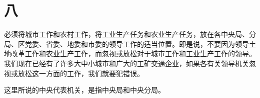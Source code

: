\section*{八}

必须将城市工作和农村工作，将工业生产任务和农业生产任务，放在各中央局、分局、区党委、省委、地委和市委的领导工作的适当位置。即是说，不要因为领导土地改革工作和农业生产工作，而忽视或放松对于城市工作和工业生产工作的领导。我们现在已经有了许多大中小城市和广大的工矿交通企业，如果各有关领导机关忽视或放松这一方面的工作，我们就要犯错误。


\begin{maonote}
这里所说的中央代表机关，是指中央局和中央分局。
\end{maonote}
